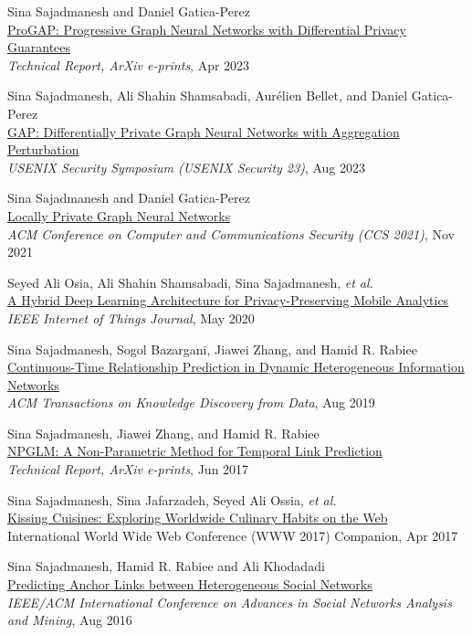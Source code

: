 \documentclass[11pt]{article}
\begin{document}
\begin{outerlist}
	\item {Sina Sajadmanesh} and Daniel Gatica-Perez\\
	\href{https://arxiv.org/abs/2304.08928}{{ProGAP: Progressive Graph Neural Networks with Differential Privacy Guarantees}}\\
	\textit{Technical Report, ArXiv e-prints}, Apr 2023

	\item {Sina Sajadmanesh}, Ali Shahin Shamsabadi, Aurélien Bellet, and Daniel Gatica-Perez\\
	\href{https://arxiv.org/abs/2203.00949}{{GAP: Differentially Private Graph Neural Networks with Aggregation Perturbation}}\\
	\textit{USENIX Security Symposium (USENIX Security 23)}, Aug 2023

	\item {Sina Sajadmanesh} and Daniel Gatica-Perez\\
	\href{https://arxiv.org/abs/2006.05535}{{Locally Private Graph Neural Networks}}\\
	\textit{ACM Conference on Computer and Communications Security (CCS 2021)}, Nov 2021

	\item Seyed Ali Osia, Ali Shahin Shamsabadi, {Sina Sajadmanesh}, \textit{et al.}\\
	\href{https://arxiv.org/abs/1703.02952}{{A Hybrid Deep Learning Architecture for Privacy-Preserving Mobile Analytics}}\\
	\textit{IEEE Internet of Things Journal}, May 2020

	\item {Sina Sajadmanesh}, Sogol Bazargani, Jiawei Zhang, and Hamid R. Rabiee\\
	\href{https://arxiv.org/abs/1710.00818}{{Continuous-Time Relationship Prediction in Dynamic Heterogeneous Information Networks}}\\
	\textit{ACM Transactions on Knowledge Discovery from Data}, Aug 2019

	\item {Sina Sajadmanesh}, Jiawei Zhang, and Hamid R. Rabiee\\
	\href{https://arxiv.org/abs/1706.06783}{{NPGLM: A Non-Parametric Method for Temporal Link Prediction}}\\
	\textit{Technical Report, ArXiv e-prints}, Jun 2017

	\item {Sina Sajadmanesh}, Sina Jafarzadeh, Seyed Ali Ossia, \textit{et al.}\\
	\href{https://arxiv.org/pdf/1610.08469}{{Kissing Cuisines: Exploring Worldwide Culinary Habits on the Web}}\\
	International World Wide Web Conference (WWW 2017) Companion, Apr 2017

	\item {Sina Sajadmanesh}, Hamid R. Rabiee and Ali Khodadadi\\
	\href{https://arxiv.org/pdf/1607.08821}{{Predicting Anchor Links between Heterogeneous Social Networks}}\\
	\textit{IEEE/ACM International Conference on Advances in Social Networks Analysis and Mining},  Aug 2016

\end{outerlist}
\end{document}

